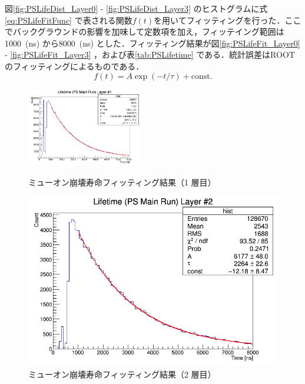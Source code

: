 図\ref{fig:PSLifeDist_Layer0} - \ref{fig:PSLifeDist_Layer3} のヒストグラムに式\eqref{eq:PSLifeFitFunc} で表される関数$f(t)$を用いてフィッティングを行った．ここでバックグラウンドの影響を加味して定数項を加え，フィッテイング範囲は1000~(ns) から8000~(ns) とした．フィッティング結果が図\ref{fig:PSLifeFit_Layer0} - \ref{fig:PSLifeFit_Layer3} ，および表\ref{tab:PSLifetime} である．統計誤差はROOT のフィッティングによるものである．
\begin{equation}
f(t) = A \exp(-t / \tau) + \mathrm{const.}
\label{eq:PSLifeFitFunc}
\end{equation}

\begin{figure}[h]
	\centering
	\includegraphics[width = 0.45\textwidth]{figure/odagawa/PSLifetimeFit_Layer0.png}
	\caption{ミューオン崩壊寿命フィッティング結果（1 層目）}
	\label{fig:PSLifeFit_Layer0}
	\begin{minipage}{0.45\textwidth}
	\centering
	\includegraphics[width = \textwidth]{figure/odagawa/PSLifetimeFit_Layer1.png}
	\caption{ミューオン崩壊寿命フィッティング結果（2 層目）}
	\label{fig:PSLifeFit_Layer1}
	\end{minipage}
	\begin{minipage}{0.45\textwidth}
	\centering

\end{minipage}
\end{figure}
